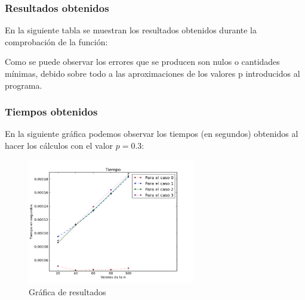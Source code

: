 \documentclass{beamer}
\begin{document}
\begin{frame}
\frametitle{Resultados obtenidos}
En la siguiente tabla se muestran los resultados obtenidos durante la comprobación de la función:
\begin{center}
\end{center}
Como se puede observar los errores que se producen son nulos o cantidades mínimas, debido sobre todo a las aproximaciones de los valores p introducidos al programa.
\end{frame}
\begin{frame}
\frametitle{Tiempos obtenidos}
En la siguiente gráfica podemos observar los tiempos (en segundos) obtenidos al hacer los cálculos con el valor $p=0.3$:
\begin{figure}[H]
\begin{center}
\includegraphics[width=0.65\textwidth]{img/figura1.png}
\caption{Gráfica de resultados}
\label{fig:1}
\end{center}
\end{figure}
\end{frame}
\end{document}
